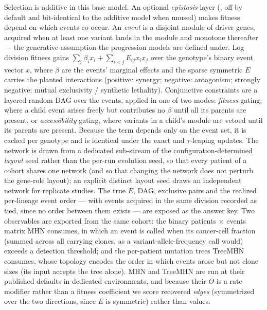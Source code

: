 \documentclass{article}
\begin{document}
Selection is additive in this base model. An optional \emph{epistasis} layer (,
off by default and bit-identical to the additive model when unused) makes fitness depend on which
events co-occur. An \emph{event} is a disjoint module of driver genes, acquired when at least one
variant lands in the module and monotone thereafter --- the generative assumption the progression
models are defined under. Log division fitness gains $\sum_i \beta_i x_i + \sum_{i<j} E_{ij} x_i x_j$
over the genotype's binary event vector $x$, where $\beta$ are the events' marginal effects and the
sparse symmetric $E$ carries the planted interactions (positive: synergy; negative: antagonism;
strongly negative: mutual exclusivity / synthetic lethality). Conjunctive constraints are a layered
random DAG over the events, applied in one of two modes: \emph{fitness} gating, where a child event
arises freely but contributes no $\beta$ until all its parents are present, or \emph{accessibility}
gating, where variants in a child's module are vetoed until its parents are present. Because the
term depends only on the event set, it is cached per genotype and is identical under the exact and
$\tau$-leaping updates. The network is drawn from a dedicated sub-stream of the configuration-determined
\emph{layout} seed rather than the per-run evolution seed, so that every patient of a cohort shares one
network (and so that changing the network does not perturb the gene-role layout); an explicit distinct
layout seed draws an independent network for replicate studies. The true $E$, DAG, exclusive pairs and
the realized per-lineage event order --- with events acquired in the same division recorded as tied,
since no order between them exists --- are exposed as the answer key. Two observables are exported
from the same cohort: the binary patients $\times$ events matrix MHN consumes, in which an event is
called when its cancer-cell fraction (summed across all carrying clones, as a variant-allele-frequency
call would) exceeds a detection threshold; and the per-patient mutation trees TreeMHN consumes, whose
topology encodes the order in which events arose but not clone sizes (its input accepts the tree
alone). MHN and TreeMHN are run at their published defaults in dedicated environments, and
because their $\Theta$ is a rate modifier rather than a fitness coefficient we score recovered
\emph{edges} (symmetrized over the two directions, since $E$ is symmetric) rather than values.
\end{document}
